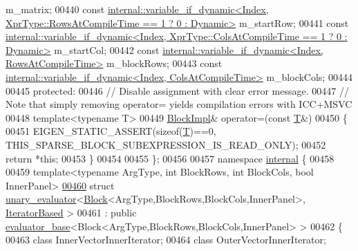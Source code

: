 \begin{DoxyCode}
       m\_matrix;
00440     \textcolor{keyword}{const} 
      \hyperlink{class_eigen_1_1internal_1_1variable__if__dynamic}{internal::variable\_if\_dynamic<Index, XprType::RowsAtCompileTime == 1 ? 0 : Dynamic>}
       m\_startRow;
00441     \textcolor{keyword}{const} 
      \hyperlink{class_eigen_1_1internal_1_1variable__if__dynamic}{internal::variable\_if\_dynamic<Index, XprType::ColsAtCompileTime == 1 ? 0 : Dynamic>}
       m\_startCol;
00442     \textcolor{keyword}{const} \hyperlink{class_eigen_1_1internal_1_1variable__if__dynamic}{internal::variable\_if\_dynamic<Index, RowsAtCompileTime>}
       m\_blockRows;
00443     \textcolor{keyword}{const} \hyperlink{class_eigen_1_1internal_1_1variable__if__dynamic}{internal::variable\_if\_dynamic<Index, ColsAtCompileTime>}
       m\_blockCols;
00444 
00445   \textcolor{keyword}{protected}:
00446     \textcolor{comment}{// Disable assignment with clear error message.}
00447     \textcolor{comment}{// Note that simply removing operator= yields compilation errors with ICC+MSVC}
00448     \textcolor{keyword}{template}<\textcolor{keyword}{typename} T>
00449     \hyperlink{class_eigen_1_1_block_impl}{BlockImpl}& operator=(\textcolor{keyword}{const} \hyperlink{group___sparse_core___module}{T}&)
00450     \{
00451       EIGEN\_STATIC\_ASSERT(\textcolor{keyword}{sizeof}(\hyperlink{group___sparse_core___module}{T})==0, THIS\_SPARSE\_BLOCK\_SUBEXPRESSION\_IS\_READ\_ONLY);
00452       \textcolor{keywordflow}{return} *\textcolor{keyword}{this};
00453     \}
00454 
00455 \};
00456 
00457 \textcolor{keyword}{namespace }\hyperlink{namespaceinternal}{internal} \{
00458 
00459 \textcolor{keyword}{template}<\textcolor{keyword}{typename} ArgType, \textcolor{keywordtype}{int} BlockRows, \textcolor{keywordtype}{int} BlockCols, \textcolor{keywordtype}{bool} InnerPanel>
\hyperlink{struct_eigen_1_1internal_1_1unary__evaluator_3_01_block_3_01_arg_type_00_01_block_rows_00_01_blodb73497179e7c432f93b3052e2754983}{00460} \textcolor{keyword}{struct }\hyperlink{struct_eigen_1_1internal_1_1unary__evaluator}{unary\_evaluator}<\hyperlink{group___core___module_class_eigen_1_1_block}{Block}<ArgType,BlockRows,BlockCols,InnerPanel>, 
      \hyperlink{struct_eigen_1_1internal_1_1_iterator_based}{IteratorBased} >
00461  : \textcolor{keyword}{public} \hyperlink{struct_eigen_1_1internal_1_1evaluator__base}{evaluator\_base}<Block<ArgType,BlockRows,BlockCols,InnerPanel> >
00462 \{
00463     \textcolor{keyword}{class }InnerVectorInnerIterator;
00464     \textcolor{keyword}{class }OuterVectorInnerIterator;

\end{DoxyCode}
